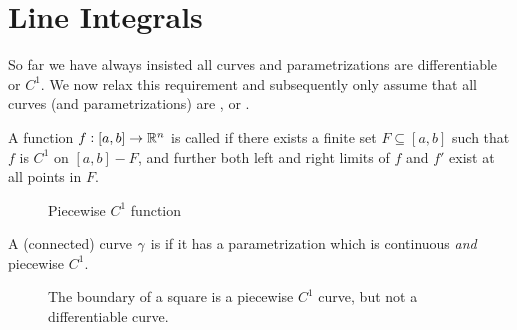  \chapter{Line Integrals}%
 \label{chapter:line}
 
  So far we have always insisted all curves and parametrizations are differentiable or $C^1$.
  We now relax this requirement and subsequently only assume that  all curves (and parametrizations) are , or .
  \begin{definition}
    A function $f:[a, b] \to \mathbb{R}^n$ is called  if there exists a finite set $F \subseteq [a, b]$ such that $f$ is $C^1$ on $[a, b] -F$, and further both left and right limits of $f$ and $f'$ exist at all points in $F$.
  \end{definition}


  
  
  \begin{figure}[h]
  \centering
\caption{Piecewise $C^1$ function}
  \end{figure}

    \begin{definition}
    A (connected) curve $\gamma$ is  if it has a parametrization which is continuous \emph{and} piecewise $C^1$.
  \end{definition}
  
   \begin{figure}[h!]
  \begin{center}
  \end{center}
  \caption{The boundary of a square is a piecewise $C^1$ curve, but not a differentiable curve.}
    \end{figure}

